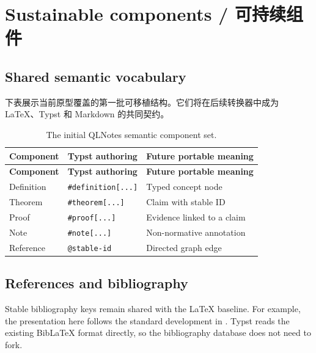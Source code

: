 \documentclass{qlnotes-export}
\begin{document}
\chapter{Sustainable components / 可持续组件}

\section{Shared semantic vocabulary}

下表展示当前原型覆盖的第一批可移植结构。它们将在后续转换器中成为 LaTeX、Typst 和 Markdown 的共同契约。

\begin{longtable}[]{@{}lll@{}}
\caption{The initial QLNotes semantic component set.}\tabularnewline
\toprule\noalign{}
\textbf{Component} & \textbf{Typst authoring} & \textbf{Future portable meaning} \\
\midrule\noalign{}
\endfirsthead
\toprule\noalign{}
\textbf{Component} & \textbf{Typst authoring} & \textbf{Future portable meaning} \\
\midrule\noalign{}
\endhead
\bottomrule\noalign{}
\endlastfoot
Definition & \texttt{\#definition{[}...{]}} & Typed concept node \\
Theorem & \texttt{\#theorem{[}...{]}} & Claim with stable ID \\
Proof & \texttt{\#proof{[}...{]}} & Evidence linked to a claim \\
Note & \texttt{\#note{[}...{]}} & Non-normative annotation \\
Reference & \texttt{@stable-id} & Directed graph edge \\
\end{longtable}

\section{References and bibliography}

Stable bibliography keys remain shared with the LaTeX baseline. For example, the presentation here follows the standard development in \autocite{folland1999}. Typst reads the existing BibLaTeX format directly, so the bibliography database does not need to fork.

\printbibliography
\end{document}
